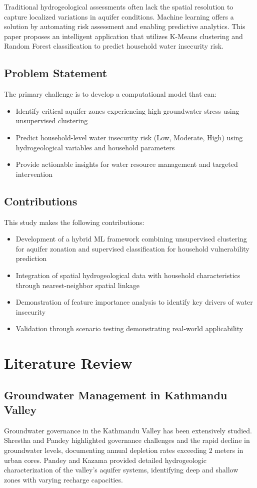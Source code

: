 \documentclass[conference]{IEEEtran}
\begin{document}
Traditional hydrogeological assessments often lack the spatial resolution to capture localized variations in aquifer conditions. Machine learning offers a solution by automating risk assessment and enabling predictive analytics. This paper proposes an intelligent application that utilizes K-Means clustering and Random Forest classification to predict household water insecurity risk.

\subsection{Problem Statement}
The primary challenge is to develop a computational model that can:
\begin{itemize}
\item Identify critical aquifer zones experiencing high groundwater stress using unsupervised clustering
\item Predict household-level water insecurity risk (Low, Moderate, High) using hydrogeological variables and household parameters
\item Provide actionable insights for water resource management and targeted intervention
\end{itemize}

\subsection{Contributions}
This study makes the following contributions:
\begin{itemize}
\item Development of a hybrid ML framework combining unsupervised clustering for aquifer zonation and supervised classification for household vulnerability prediction
\item Integration of spatial hydrogeological data with household characteristics through nearest-neighbor spatial linkage
\item Demonstration of feature importance analysis to identify key drivers of water insecurity
\item Validation through scenario testing demonstrating real-world applicability
\end{itemize}

\section{Literature Review}

\subsection{Groundwater Management in Kathmandu Valley}
Groundwater governance in the Kathmandu Valley has been extensively studied. Shrestha and Pandey \cite{shrestha2018groundwater} highlighted governance challenges and the rapid decline in groundwater levels, documenting annual depletion rates exceeding 2 meters in urban cores. Pandey and Kazama \cite{pandey2012hydrogeologic} provided detailed hydrogeologic characterization of the valley's aquifer systems, identifying deep and shallow zones with varying recharge capacities.
\end{document}

